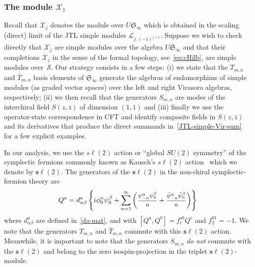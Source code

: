 \documentclass[11pt]{article}
\newcommand{\strt}{T}
\newcommand{\bstrt}{\bar{\strt}}
\newcommand{\ffrac}[2]{\mbox{\footnotesize$\displaystyle\frac{#1}{#2}$}}
\newcommand{\interLie}{\mathfrak{S}}
\newcommand{\interchalg}{\mathcal{S}}
\newcommand{\interinfin}{\interLie_{\infty}}
\newcommand{\interM}[1]{\mathscr{X}_{#1}}
\newcommand{\interMco}[1]{\overline{\mathscr{X}}_{#1}}
\newcommand{\nSU}{\boldsymbol{s\ell}}
\newcommand{\bz}{\bar{z}}
\newcommand{\enrg}{S}
\newcommand{\AIrrTL}[2]{\mathscr{L}_{#1,#2}}
\theoremstyle{definition}
\begin{document}




\subsubsection{The module $\interM{1}$}\label{sec:interch-simple}
Recall that $\interM{j}$ denotes the module over
$U\interinfin$ which is obtained in the scaling (direct) limit of the JTL simple modules $\AIrrTL{j}{(-1)^{j+1}}$. Suppose we wish to  check directly that $\interM{j}$ are simple  modules over the algebra $U\interinfin$ and that their completions $\interMco{j}$ in the sense of the formal topology, see~\eqref{eq:cHilb}, are simple modules over~$\interchalg$. Our strategy consists in a few steps: (i) we
state that the  $\strt_{m,n}$  and $\bstrt_{m,n}$ basis elements of $\interinfin$ generate the algebras of endomorphims of simple modules (as graded vector spaces) over the left and right Virasoro algebras, respectively; (ii) we then recall that the generators  $\enrg_{m,n}$ are modes of the interchiral field $\enrg(z,\bz)$ of dimension $(1,1)$  and (iii) finally we use the operator-state  correspondence in CFT and identify  composite fields in $\enrg(z,\bz)$ and its derivatives  that produce the direct summands in~\eqref{JTL-simple-Vir-sum} for a few explicit examples.

In our analysis, we use the $s\ell(2)$ action or ``global $SU(2)$ symmetry'' of the symplectic fermions commonly known as Kausch's $s\ell(2)$ action~\cite{Kausch} which we denote by  $\nSU(2)$. The generators of the  $\nSU(2)$ in the non-chiral symplectic-fermion theory are
%
\begin{equation}\label{eq:Kausch-SU}
Q^a=d^a_{\alpha\beta}\left\{i\phi^\alpha_0\psi^\beta_0+\sum_{n=1}^\infty
\left(\ffrac{\psi^\alpha_{-n}\psi^\beta_n}{n} + \ffrac{\bar{\psi}^\alpha_{-n}\bar{\psi}^\beta_n}{n}\right)\right\}
\end{equation}
%
where $d^a_{\alpha\beta}$ are defined in~\eqref{da-mat}, and with $[Q^a,Q^b]=f^{ab}_cQ^c$ and $f^{01}_2=-1$.
We note  that the generators  $\strt_{m,n}$ and  $\bstrt_{m,n}$ commute with this $\nSU(2)$ action. Meanwhile, it is  important to note   that the generators $\enrg_{m,n}$ \textit{do not} commute with the $\nSU(2)$ and belong to the zero isospin-projection in the triplet $\nSU(2)$-module.
\end{document}
